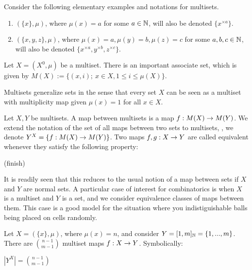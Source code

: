 \begin{exmp}
	Consider the following elementary examples and notations for multisets.
	
	\begin{enumerate}
		\item $(\{x\}, \mu)$, where $\mu(x)=a$ for some $a \in \mathbb{N}$, will also be denoted $\{x^{\times a} \}$.
		
		\item $(\{x, y, z\}, \mu)$, where $\mu(x)=a, \mu(y)=b, \mu(z)=c$ for some $a, b, c \in \mathbb{N}$, will also be denoted $\{x^{\times a},y^{\times b}, z^{\times c} \}$.
	\end{enumerate}
	
	
\end{exmp}

\begin{definition}
	Let $X = (X^0, \mu)$ be a multiset. There is an important associate set, which is given by $M(X) := \{(x, i); \ x \in X, 1\leq i \leq \mu(X) \}$. 	
\end{definition}

Multisets generalize sets in the sense that every set $X$ can be seen as a multiset with multiplicity map given $\mu(x)=1$ for all $x \in X$.

\begin{definition}
	Let $X, Y$ be multisets. A map between multisets is a map $f:M(X) \rightarrow M(Y)$. We extend the notation of the set of all maps between two sets to multisets, \ie, we denote $Y^X=\{f:M(X) \rightarrow M(Y) \}$. Two maps $f, g: X \rightarrow Y$ are called equivalent whenever they satisfy the following property:
	
	\begin{center}
		(finish)
	\end{center}
\end{definition}

It is readily seen that this reduces to the usual notion of a map between sets if $X$ and $Y$ are normal sets. A particular case of interest for combinatorics is when $X$ is a multiset and $Y$ is a set, and we consider equivalence classes of maps between them. This case is a good model for the situation where you indistiguishable balls being placed on cells randomly.

\begin{proposition}
	Let $X=(\{x\}, \mu)$, where $\mu(x) = n$, and consider $Y = [1, m]_{\mathbb{N}} = \{1, ..., m \}$. There are $\binom{n-1}{m-1}$ multiset maps $f:X \rightarrow Y$. Symbolically:
	
	\begin{center}
		$|Y^X|= \binom{n-1}{m-1}$
	\end{center}
\end{proposition}

